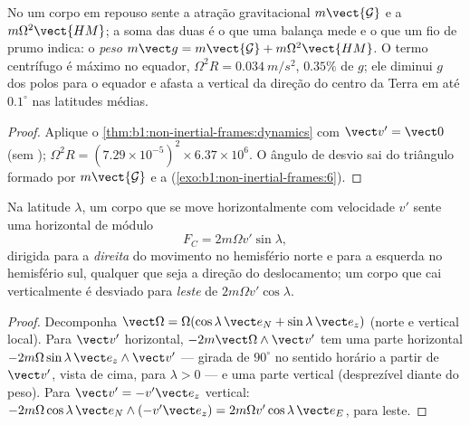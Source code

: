 \begin{proposition}\label{prop:b1:non-inertial-frames:weight}
No  um corpo em repouso sente a atração gravitacional
$m\vect{\mathcal G}$ e a  $m\Omega^2\vect{HM}$; a soma das duas
é o que uma balança mede e o que um fio de prumo indica: o \emph{peso}
$m\vect g = m\vect{\mathcal G} + m\Omega^2\vect{HM}$. O termo centrífugo é máximo
no equador, $\Omega^2R = \qty{0.034}{m/s^2}$, $0.35\%$ de $g$; ele diminui
$g$ dos polos para o equador e afasta a vertical da direção do centro da
Terra em até $0.1^\circ$ nas latitudes médias.
\end{proposition}

\begin{proof}
Aplique o \cref{thm:b1:non-inertial-frames:dynamics} com $\vect v' = \vect 0$
(sem ); $\Omega^2R = (7.29\times10^{-5})^2 \times 6.37\times10^6$.
O ângulo de desvio sai do triângulo formado por $m\vect{\mathcal G}$ e a
 (\cref{exo:b1:non-inertial-frames:6}).
\end{proof}

\begin{proposition}\label{prop:b1:non-inertial-frames:coriolis}
Na latitude $\lambda$, um corpo que se move horizontalmente com velocidade
$v'$ sente uma  horizontal de módulo
\[
F_C = 2m\Omega v'\sin\lambda ,
\]
dirigida para a \emph{direita} do movimento no hemisfério norte e para a
esquerda no hemisfério sul, qualquer que seja a direção do deslocamento; um
corpo que cai verticalmente é desviado para \emph{leste} de $2m\Omega v'\cos\lambda$.
\end{proposition}

\begin{proof}
Decomponha $\vect\Omega = \Omega(\cos\lambda\,\vect e_N + \sin\lambda\,\vect e_z)$
(norte e vertical local). Para $\vect v'$ horizontal, $-2m\vect\Omega\wedge\vect v'$
tem uma parte horizontal $-2m\Omega\sin\lambda\,\vect e_z\wedge\vect v'$ --- girada
de $90^\circ$ no sentido horário a partir de $\vect v'$, vista de cima, para $\lambda > 0$ ---
e uma parte vertical (desprezível diante do peso). Para $\vect v' =
-v'\vect e_z$ vertical: $-2m\Omega\cos\lambda\,\vect e_N\wedge(-v'\vect e_z) = 2m\Omega v'\cos\lambda\,
\vect e_E$, para leste.
\end{proof}

